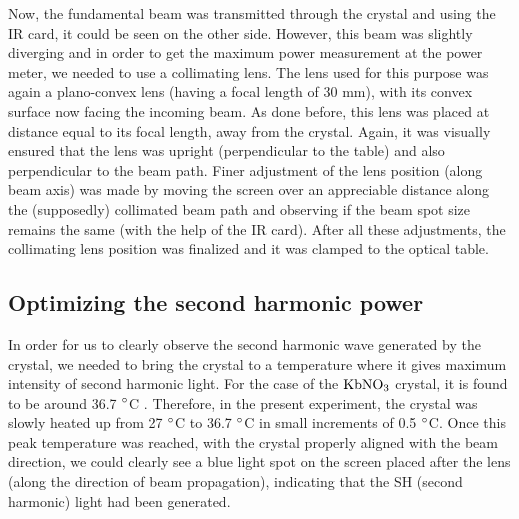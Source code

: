 Now, the fundamental beam was transmitted through the crystal and using the IR card, it could be seen on the other side. However, this beam was slightly diverging and in order to get the maximum power measurement at the power meter, we needed to use a collimating lens. The lens used for this purpose was again a plano-convex lens (having a focal length of 30 mm), with its convex surface now facing the incoming beam. As done before, this lens was placed at distance equal to its focal length, away from the crystal. Again, it was visually ensured that the lens was upright (perpendicular to the table) and also perpendicular to the beam path. Finer adjustment of the lens position (along beam axis) was made by moving the screen over an appreciable distance along the (supposedly) collimated beam path and observing if the beam spot size remains the same (with the help of the IR card). After all these adjustments, the collimating lens position was finalized and it was clamped to the optical table.

\subsection{Optimizing the second harmonic power}
In order for us to clearly observe the second harmonic wave generated by the crystal, we needed to bring the crystal to a temperature where it gives maximum intensity of second harmonic light. For the case of the $\rm{KbNO_{3}}$ crystal, it is found to be around 36.7 $\degree$C \cite{UB}. Therefore, in the present experiment, the crystal was slowly heated up from 27 $\degree$C to 36.7 $\degree$C in small increments of 0.5 $\degree$C. Once this peak temperature was reached, with the crystal properly aligned with the beam direction, we could clearly see a blue light spot on the screen placed after the lens (along the direction of beam propagation), indicating that the SH (second harmonic) light had been generated. 

